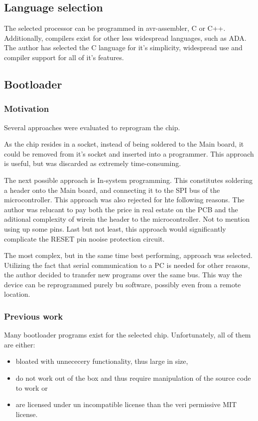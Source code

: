 \subsection{Language selection}
The selected processor can be programmed in avr-assembler, C or C++.
Additionally, compilers exist for other less widespread languages, such as ADA.
The author has selected the C language for it's simplicity, widespread use and compiler support for all of it's features.

\subsection{Bootloader}
\subsubsection{Motivation}
Several approaches were evaluated to reprogram the chip.
\par
As the chip resides in a socket, instead of being soldered to the Main board, it could be removed from it's socket and inserted into a programmer.
This approach is useful, but was discarded as extremely time-consuming.
\par
The next possible approach is In-system programming.
This constitutes soldering a header onto the Main board, and connecting it to the SPI bus of the microcontroller.
This approach was also rejected for hte following reasons.
The author was relucant to pay both the price in real estate on the PCB and the aditional complexity of wirein the header to the microcontroller.
Not to mention using up some pins.
Last but not least, this approach would significantly complicate the RESET pin nooise protection circuit.
\par
The most complex, but in the same time best performing, approach was selected.
Utilizing the fact that serial communication to a PC is needed for other reasons, the author decided to transfer new programs over the same bus.
This way the device can be reprogrammed purely bu software, possibly even from a remote location.

\subsubsection{Previous work}
Many bootloader programs exist for the selected chip.
Unfortunately, all of them are either:
\begin{itemize}
\item{bloated with unnececery functionality, thus large in size,}
\item{do not work out of the box and thus require manipulation of the source code to work or}
\item{are licensed under un incompatible license than the veri permissive MIT license.}
\end{itemize}

